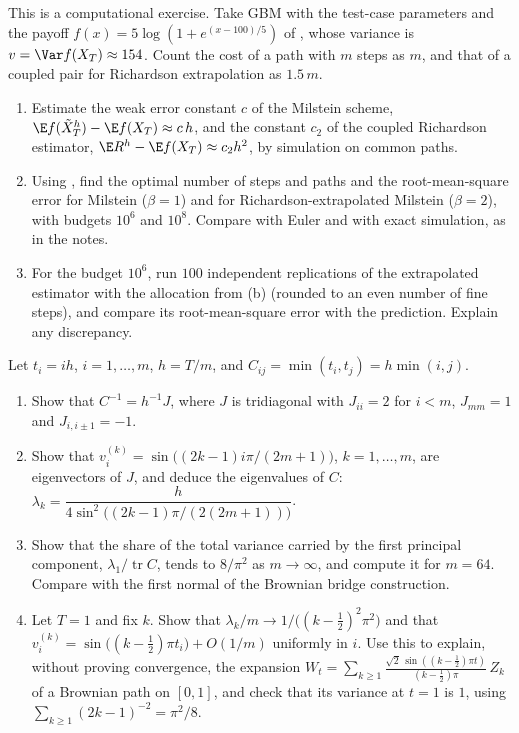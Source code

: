 \begin{exercise}\label{ex:ps-allocation-milstein}
\medium This is a computational exercise. Take GBM with the test-case parameters and the
payoff $f(x)=5\log(1+e^{(x-100)/5})$ of , whose variance is
$v=\Var f(X_T)\approx154$. Count the cost of a path with $m$ steps as $m$, and that of a
coupled pair for Richardson extrapolation as $1.5\,m$.
\begin{enumerate}[label=(\alph*)]
  \item Estimate the weak error constant $c$ of the Milstein scheme,
    $\E f(\tilde X^h_T)-\E f(X_T)\approx c\,h$, and the constant $c_2$ of the coupled Richardson
    estimator, $\E R^h-\E f(X_T)\approx c_2h^2$, by simulation on common paths.
  \item Using , find the optimal number of steps and paths and the
    root-mean-square error for Milstein ($\beta=1$) and for Richardson-extrapolated Milstein
    ($\beta=2$), with budgets $10^6$ and $10^8$. Compare with Euler and with exact
    simulation, as in the notes.
  \item For the budget $10^6$, run $100$ independent replications of the extrapolated
    estimator with the allocation from (b) (rounded to an even number of fine steps), and
    compare its root-mean-square error with the prediction. Explain any discrepancy.
\end{enumerate}
\end{exercise}

\begin{exercise}\label{ex:ps-pca-eigen}
\hard Let $t_i=ih$, $i=1,\dots,m$, $h=T/m$, and $C_{ij}=\min(t_i,t_j)=h\min(i,j)$.
\begin{enumerate}[label=(\alph*)]
  \item Show that $C^{-1}=h^{-1}J$, where $J$ is tridiagonal with $J_{ii}=2$ for $i<m$,
    $J_{mm}=1$ and $J_{i,i\pm1}=-1$.
  \item Show that $v^{(k)}_i=\sin\big((2k-1)i\pi/(2m+1)\big)$, $k=1,\dots,m$, are eigenvectors
    of $J$, and deduce the eigenvalues of $C$:
    $\lambda_k=\dfrac{h}{4\sin^2\big((2k-1)\pi/(2(2m+1))\big)}$.
  \item Show that the share of the total variance carried by the first principal component,
    $\lambda_1/\operatorname{tr}C$, tends to $8/\pi^2$ as $m\to\infty$, and compute it for
    $m=64$. Compare with the first normal of the Brownian bridge construction.
  \item Let $T=1$ and fix $k$. Show that $\lambda_k/m\to1/\big((k-\frac12)^2\pi^2\big)$ and that
    $v^{(k)}_i=\sin\big((k-\frac12)\pi t_i\big)+O(1/m)$ uniformly in $i$. Use this to explain,
    without proving convergence, the expansion
    $W_t=\sum_{k\ge1}\frac{\sqrt2\,\sin((k-\frac12)\pi t)}{(k-\frac12)\pi}\,Z_k$ of a Brownian
    path on $[0,1]$, and check that its variance at $t=1$ is $1$, using
    $\sum_{k\ge1}(2k-1)^{-2}=\pi^2/8$.
\end{enumerate}
\end{exercise}

